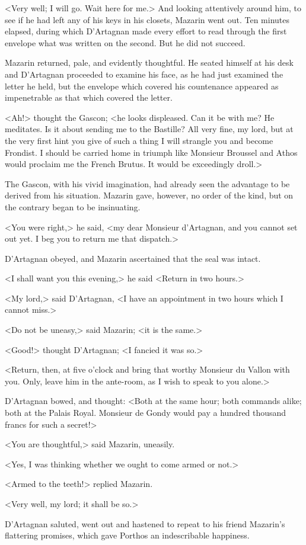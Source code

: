 <Very well; I will go. Wait here for me.> And looking attentively around him, to see if he had left any of his keys in his closets, Mazarin went out. Ten minutes elapsed, during which D'Artagnan made every effort to read through the first envelope what was written on the second. But he did not succeed.

Mazarin returned, pale, and evidently thoughtful. He seated himself at his desk and D'Artagnan proceeded to examine his face, as he had just examined the letter he held, but the envelope which covered his countenance appeared as impenetrable as that which covered the letter.

<Ah!> thought the Gascon; <he looks displeased. Can it be with me? He meditates. Is it about sending me to the Bastille? All very fine, my lord, but at the very first hint you give of such a thing I will strangle you and become Frondist. I should be carried home in triumph like Monsieur Broussel and Athos would proclaim me the French Brutus. It would be exceedingly droll.>

The Gascon, with his vivid imagination, had already seen the advantage to be derived from his situation. Mazarin gave, however, no order of the kind, but on the contrary began to be insinuating.

<You were right,> he said, <my dear Monsieur d'Artagnan, and you cannot set out yet. I beg you to return me that dispatch.>

D'Artagnan obeyed, and Mazarin ascertained that the seal was intact.

<I shall want you this evening,> he said <Return in two hours.>

<My lord,> said D'Artagnan, <I have an appointment in two hours which I cannot miss.>

<Do not be uneasy,> said Mazarin; <it is the same.>

<Good!> thought D'Artagnan; <I fancied it was so.>

<Return, then, at five o'clock and bring that worthy Monsieur du Vallon with you. Only, leave him in the ante-room, as I wish to speak to you alone.>

D'Artagnan bowed, and thought: <Both at the same hour; both commands alike; both at the Palais Royal. Monsieur de Gondy would pay a hundred thousand francs for such a secret!>

<You are thoughtful,> said Mazarin, uneasily.

<Yes, I was thinking whether we ought to come armed or not.>

<Armed to the teeth!> replied Mazarin.

<Very well, my lord; it shall be so.>

D'Artagnan saluted, went out and hastened to repeat to his friend Mazarin's flattering promises, which gave Porthos an indescribable happiness. 